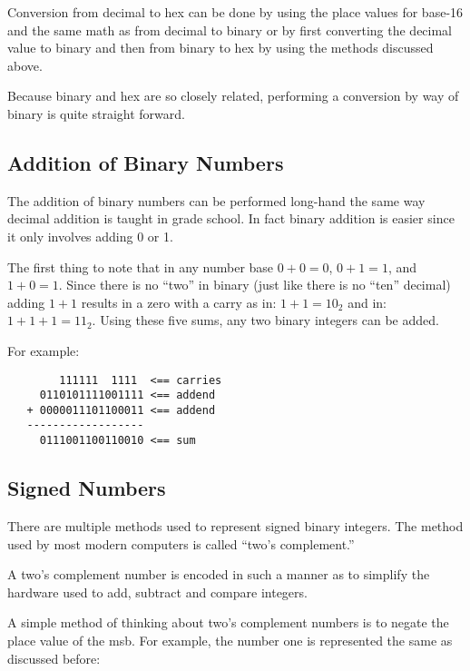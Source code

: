 Conversion from decimal to hex can be done by using the place
values for base-16 and the same math as from decimal to binary
or by first converting the decimal value to binary and then
from binary to hex by using the methods discussed above.

Because binary and hex are so closely related, performing
a conversion by way of binary is quite straight forward.


\subsection{Addition of Binary Numbers}

The addition of binary numbers can be performed long-hand the
same way decimal addition is taught in grade school.  In fact binary
addition is easier since it only involves adding 0 or 1.

The first thing to note that in any number base $0+0=0$, $0+1=1$, and 
$1+0=1$.  Since there is no ``two'' in binary (just like there is 
no ``ten'' decimal) adding $1+1$ results in a zero with a carry as
in: $1+1=10_2$ and in: $1+1+1=11_2$.  Using these five sums, any two
binary integers can be added.

For example:

\begin{verbatim}
        111111  1111  <== carries
     0110101111001111 <== addend
   + 0000011101100011 <== addend
   ------------------
     0111001100110010 <== sum
\end{verbatim}

\subsection{Signed Numbers}

There are multiple methods used to represent signed binary integers.
The method used by most modern computers is called ``two's complement.''

A two's complement number is encoded in such a manner as to simplify
the hardware used to add, subtract and compare integers.  

A simple method of thinking about two's complement numbers is to
negate the place value of the \acrshort{msb}.  For example, the 
number one is represented the same as discussed before:

